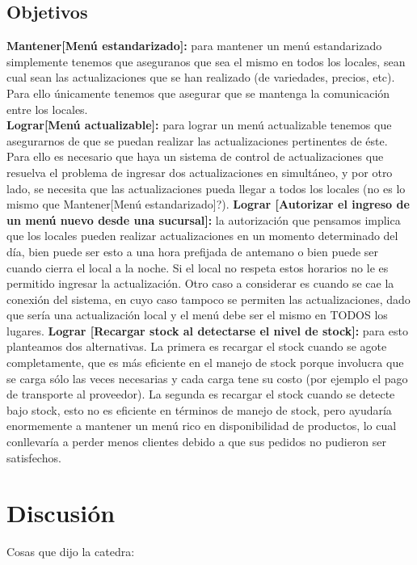 \documentclass[a4paper,10pt]{article}
\begin{document}
\subsection*{Objetivos}
\noindent
\textbf{Mantener[Menú estandarizado]:} para mantener un menú estandarizado simplemente tenemos que aseguranos que sea el mismo en todos los locales, sean cual sean las actualizaciones que se han realizado (de variedades, precios, etc). Para ello únicamente tenemos que asegurar que se mantenga la comunicación entre los locales. \\
\textbf{Lograr[Menú actualizable]:} para lograr un menú actualizable tenemos que asegurarnos de que se puedan realizar las actualizaciones pertinentes de éste. Para ello es necesario que haya un sistema de control de actualizaciones que resuelva el problema de ingresar dos actualizaciones en simultáneo, y por otro lado, se necesita que las actualizaciones pueda llegar a todos los locales (no es lo mismo que Mantener[Menú estandarizado]?).
\textbf{Lograr [Autorizar el ingreso de un menú nuevo desde una sucursal]:} la autorización que pensamos implica que los locales pueden realizar actualizaciones en un momento determinado del día, bien puede ser esto a una hora prefijada de antemano o bien puede ser cuando cierra el local a la noche. Si el local no respeta estos horarios no le es permitido ingresar la actualización. Otro caso a considerar es cuando se cae la conexión del sistema, en cuyo caso tampoco se permiten las actualizaciones, dado que sería una actualización local y el menú debe ser el mismo en TODOS los lugares.
\textbf{Lograr [Recargar stock al detectarse el nivel de stock]:} para esto planteamos dos alternativas. La primera es recargar el stock cuando se agote completamente, que es más eficiente en el manejo de stock porque involucra que se carga sólo las veces necesarias y cada carga tene su costo (por ejemplo el pago de transporte al proveedor). La segunda es recargar el stock cuando se detecte bajo stock, esto no es eficiente en términos de manejo de stock, pero ayudaría enormemente a mantener un menú rico en disponibilidad de productos, lo cual conllevaría a perder menos clientes debido a que sus pedidos no pudieron ser satisfechos.


\section*{Discusi\'on}

Cosas que dijo la catedra:
\end{document}
